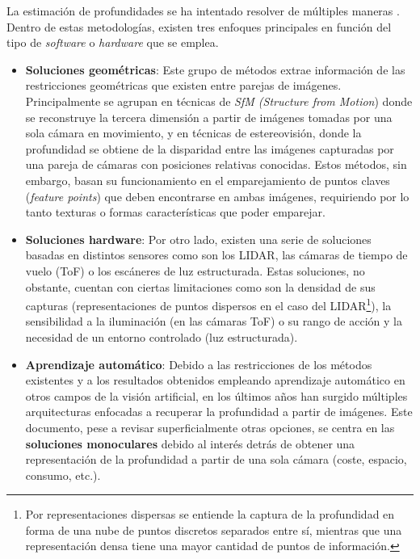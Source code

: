 La estimación de profundidades se ha intentado resolver de múltiples maneras \cite{Zhao_2020}. Dentro de estas metodologías, existen tres enfoques principales en función del tipo de \textit{software} o \textit{hardware} que se emplea.
\begin{itemize}
    \item \textbf{Soluciones geométricas}: Este grupo de métodos extrae información de las restricciones geométricas que existen entre parejas de imágenes. Principalmente se agrupan en técnicas de \textit{SfM (Structure from Motion}) donde se reconstruye la tercera dimensión a partir de imágenes tomadas por una sola cámara en movimiento, y en técnicas de estereovisión, donde la profundidad se obtiene de la disparidad entre las imágenes capturadas por una pareja de cámaras con posiciones relativas conocidas. Estos métodos, sin embargo, basan su funcionamiento en el emparejamiento de puntos claves (\textit{feature points}) que deben encontrarse en ambas imágenes, requiriendo por lo tanto texturas o formas características que poder emparejar.
    \item \textbf{Soluciones hardware}: Por otro lado, existen una serie de soluciones basadas en distintos sensores como son los LIDAR, las cámaras de tiempo de vuelo (ToF) o los escáneres de luz estructurada. Estas soluciones, no obstante, cuentan con ciertas limitaciones como son la densidad de sus capturas (representaciones de puntos dispersos en el caso del LIDAR\footnote{Por representaciones dispersas se entiende la captura de la profundidad en forma de una nube de puntos discretos separados entre sí, mientras que una representación densa tiene una mayor cantidad de puntos de información.}), la sensibilidad a la iluminación (en las cámaras ToF) o su rango de acción y la necesidad de un entorno controlado (luz estructurada).
    \item \textbf{Aprendizaje automático}: Debido a las restricciones de los métodos existentes y a los resultados obtenidos empleando aprendizaje automático en otros campos de la visión artificial, en los últimos años han surgido múltiples arquitecturas enfocadas a recuperar la profundidad a partir de imágenes. Este documento, pese a revisar superficialmente otras opciones, se centra en las \textbf{soluciones monoculares} debido al interés detrás de obtener una representación de la profundidad a partir de una sola cámara (coste, espacio, consumo, etc.).
\end{itemize}


